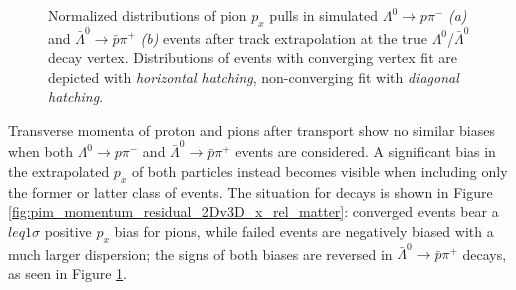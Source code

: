 \begin{figure}[t]
\begin{subfigure}{.45\textwidth}
		\caption{}
		\label{fig:pim_momentum_residual_2Dv3D_x_rel_antimatter}
	\end{subfigure}
	\caption{Normalized distributions of pion $p_x$ pulls in simulated $\Lambda^0 \rightarrow p\pi^-$ \textit{(a)} and $\bar{\Lambda}^0 \rightarrow \bar{p}\pi^+$ \textit{(b)} events after track extrapolation at the true $\Lambda^0$/$\bar{\Lambda}^0$ decay vertex.
	Distributions of events with converging vertex fit are depicted with \textit{horizontal hatching}, non-converging fit with \textit{diagonal hatching}.}
	\label{fig:3:pim_momentum_residual_2Dv3D_x_rel}
\end{figure}

Transverse momenta of proton and pions after transport show no similar biases when both $\Lambda^0 \rightarrow p\pi^-$ and $\bar{\Lambda}^0 \rightarrow \bar{p}\pi^+$ events are considered.
A significant bias in the extrapolated $p_x$ of both particles instead becomes visible when including only the former or latter class of events.
The situation for \lz decays is shown in Figure \ref{fig:pim_momentum_residual_2Dv3D_x_rel_matter}:
converged events bear a $leq 1\sigma$ positive $p_x$ bias for pions, while failed events are negatively biased with a much larger dispersion; the signs of both biases are reversed 
in $\bar{\Lambda}^0 \rightarrow \bar{p}\pi^+$ decays, as seen in Figure \ref{fig:pim_momentum_residual_2Dv3D_x_rel_antimatter}.

